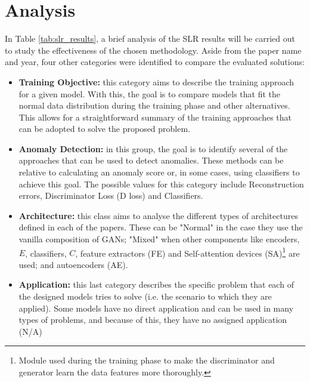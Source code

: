 \section{Analysis}\label{sec:res_analysis}
In Table \ref{tab:slr_results}, a brief analysis of the SLR results will be carried out to study the effectiveness of the chosen methodology. Aside from the paper name and year, four other categories were identified to compare the evaluated solutions:

\begin{itemize}
    \item \textbf{Training Objective:} this category aims to describe the training approach for a given model. With this, the goal is to compare models that fit the normal data distribution during the training phase and other alternatives. This allows for a straightforward summary of the training approaches that can be adopted to solve the proposed problem.

    \item \textbf{Anomaly Detection:} in this group, the goal is to identify several of the approaches that can be used to detect anomalies. These methods can be relative to calculating an anomaly score or, in some cases, using classifiers to achieve this goal. The possible values for this category include Reconstruction errors, Discriminator Loss (D loss) and Classifiers.

    \item \textbf{Architecture:} this class aims to analyse the different types of architectures defined in each of the papers. These can be "Normal" in the case they use the vanilla composition of GANs;  "Mixed" when other components like encoders, $E$, classifiers, $C$, feature extractors (FE) and Self-attention devices (SA)\footnote{Module used during the training phase to make the discriminator and generator learn the data features more thoroughly.} are used; and autoencoders (AE).

    \item \textbf{Application:} this last category describes the specific problem that each of the designed models tries to solve (i.e. the scenario to which they are applied). Some models have no direct application and can be used in many types of problems, and because of this, they have no assigned application (N/A)
\end{itemize}



